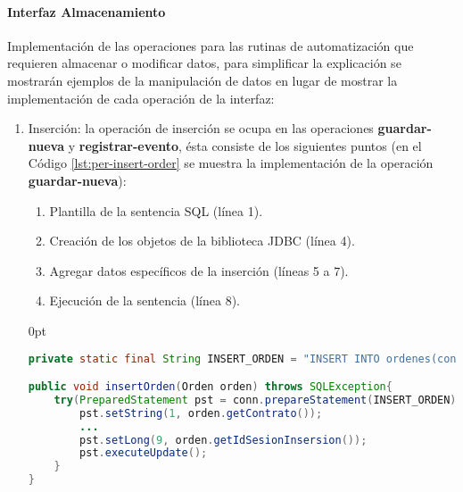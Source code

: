 \paragraph{\indent Interfaz Almacenamiento\\}
Implementación de las operaciones para las rutinas de automatización que requieren almacenar o modificar datos, para simplificar la explicación se mostrarán ejemplos de la manipulación de datos en lugar de mostrar la implementación de cada operación de la interfaz:
\begin{enumerate}
	\item Inserción: la operación de inserción se ocupa en las operaciones \textbf{guardar-nueva} y \textbf{registrar-evento}, ésta consiste de los siguientes puntos (en el Código \ref{lst:per-insert-order} se muestra la implementación de la operación \textbf{guardar-nueva}):
	\begin{enumerate}
		\item Plantilla de la sentencia SQL (línea 1).
		\item Creación de los objetos de la biblioteca JDBC (línea 4).
		\item Agregar datos específicos de la inserción (líneas 5 a 7).
		\item Ejecución de la sentencia (línea 8).
	\end{enumerate}

	\begin{adjustwidth}{\listingfixwidth}{0pt}
	\begin{lstlisting}[language=Java, caption={Inserción de una nueva orden de reposición en la base de datos.}, captionpos=b, label={lst:per-insert-order}]
private static final String INSERT_ORDEN = "INSERT INTO ordenes(contrato, solicitud, orden, fecha_expedicion, almacen_destino, url_con, url_env, estatus, id_sesion_insersion, id_sesion_estatus, fecha_estatus) VALUES(?, ?, ?, ?, ?, ?, ?, 1, ?, ?, CURRENT_TIMESTAMP)";

public void insertOrden(Orden orden) throws SQLException{
    try(PreparedStatement pst = conn.prepareStatement(INSERT_ORDEN)){
	    pst.setString(1, orden.getContrato());
	    ...
	    pst.setLong(9, orden.getIdSesionInsersion());
	    pst.executeUpdate();
	}
}
	\end{lstlisting}
	\end{adjustwidth}


\end{enumerate}
